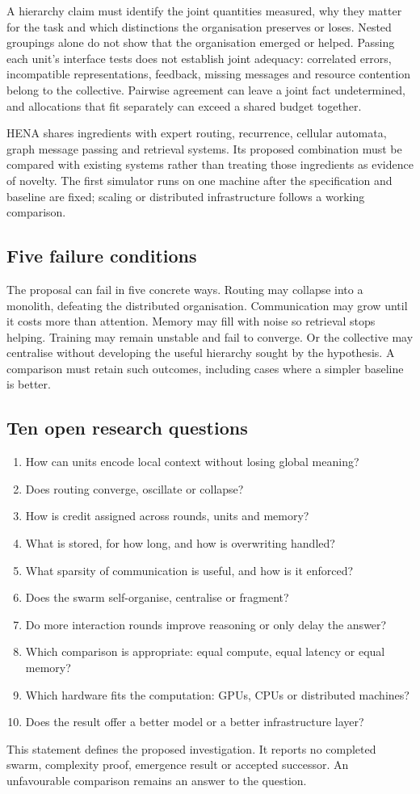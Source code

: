 A hierarchy claim must identify the joint quantities measured, why they matter for the task and which distinctions the organisation preserves or loses. Nested groupings alone do not show that the organisation emerged or helped. Passing each unit's interface tests does not establish joint adequacy: correlated errors, incompatible representations, feedback, missing messages and resource contention belong to the collective. Pairwise agreement can leave a joint fact undetermined, and allocations that fit separately can exceed a shared budget together.

HENA shares ingredients with expert routing, recurrence, cellular automata, graph message passing and retrieval systems. Its proposed combination must be compared with existing systems rather than treating those ingredients as evidence of novelty. The first simulator runs on one machine after the specification and baseline are fixed; scaling or distributed infrastructure follows a working comparison.

\subsection{Five failure conditions}

The proposal can fail in five concrete ways. Routing may collapse into a monolith, defeating the distributed organisation. Communication may grow until it costs more than attention. Memory may fill with noise so retrieval stops helping. Training may remain unstable and fail to converge. Or the collective may centralise without developing the useful hierarchy sought by the hypothesis. A comparison must retain such outcomes, including cases where a simpler baseline is better.

\subsection{Ten open research questions}

\begin{enumerate}
\item How can units encode local context without losing global meaning?
\item Does routing converge, oscillate or collapse?
\item How is credit assigned across rounds, units and memory?
\item What is stored, for how long, and how is overwriting handled?
\item What sparsity of communication is useful, and how is it enforced?
\item Does the swarm self-organise, centralise or fragment?
\item Do more interaction rounds improve reasoning or only delay the answer?
\item Which comparison is appropriate: equal compute, equal latency or equal memory?
\item Which hardware fits the computation: GPUs, CPUs or distributed machines?
\item Does the result offer a better model or a better infrastructure layer?
\end{enumerate}

This statement defines the proposed investigation. It reports no completed swarm, complexity proof, emergence result or accepted successor. An unfavourable comparison remains an answer to the question.
